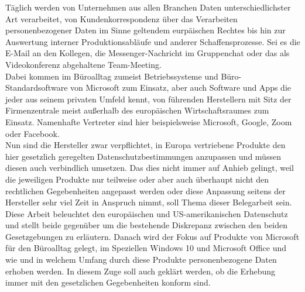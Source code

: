 Täglich werden von Unternehmen aus allen Branchen Daten unterschiedlichster Art verarbeitet, von Kundenkorrespondenz über das Verarbeiten personenbezogener Daten im Sinne geltendem eurpäischen Rechtes bis hin zur Auswertung interner Produktionsabläufe und anderer Schaffensprozesse. Sei es die E-Mail an den Kollegen, die Messenger-Nachricht im Gruppenchat oder das als Videokonferenz abgehaltene Team-Meeting.\\
Dabei kommen im Büroalltag zumeist Betriebssysteme und Büro-Standardsoftware von Microsoft zum Einsatz, aber auch Software und Apps die jeder aus seinem privaten Umfeld kennt, von führenden Herstellern mit Sitz der Firmenzentrale meist außerhalb des europäischen Wirtschaftsraumes zum Einsatz. Namenhafte Vertreter sind hier beispielsweise Microsoft, Google, Zoom oder Facebook.\\
Nun sind die Hersteller zwar verpflichtet, in Europa vertriebene Produkte den hier gesetzlich geregelten Datenschutzbestimmungen anzupassen und müssen diesen auch verbindlich umsetzen. Das dies nicht immer auf Anhieb gelingt, weil die jeweiligen Produkte nur teilweise oder aber auch überhaupt nicht den rechtlichen Gegebenheiten angepasst werden oder diese Anpassung seitens der Hersteller sehr viel Zeit in Anspruch nimmt, soll Thema dieser Belegarbeit sein.\\
Diese Arbeit beleuchtet den europäischen und US-amerikanischen Datenschutz und stellt beide gegenüber um die bestehende Diskrepanz zwischen den beiden Gesetzgebungen zu erläutern. Danach wird der Fokus auf Produkte von Microsoft für den Büroalltag gelegt, im Speziellen Windows 10 und Microsoft Office und wie und in welchem Umfang durch diese Produkte personenbezogene Daten erhoben werden. In diesem Zuge soll auch geklärt werden, ob die Erhebung immer mit den gesetzlichen Gegebenheiten konform sind.